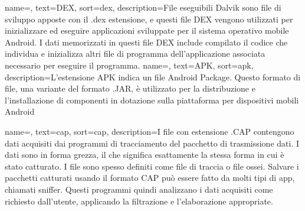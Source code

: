 {
    name=,
    text=DEX,
    sort=dex,
    description={File eseguibili Dalvik sono file di sviluppo apposte con il .dex estensione, e questi file DEX vengono utilizzati per inizializzare ed eseguire applicazioni sviluppate per il sistema operativo mobile Android.
    I dati memorizzati in questi file DEX include compilato il codice che individua e inizializza altri file di programma dell'applicazione associata necessario per eseguire il programma.}
}
{
    name=,
    text=APK,
    sort=apk,
    description={L'estensione APK indica un file Android Package. Questo formato di file, una variante del formato .JAR, è utilizzato per la distribuzione e l'installazione di componenti in dotazione sulla piattaforma per dispositivi mobili Android}
}

{
    name=,
    text=cap,
    sort=cap,
    description={I  file con estensione .CAP contengono dati acquisiti dai programmi di tracciamento del pacchetto di trasmissione dati. I dati sono in forma grezza, il che significa esattamente la stessa forma in cui è stato catturato.
    I file sono spesso definiti come file di traccia o file ossei. Salvare i pacchetti catturati usando il formato CAP può essere fatto da molti tipi di app, chiamati sniffer. Questi programmi quindi analizzano i dati acquisiti come richiesto dall'utente, applicando la filtrazione e l'elaborazione appropriate.}
}

